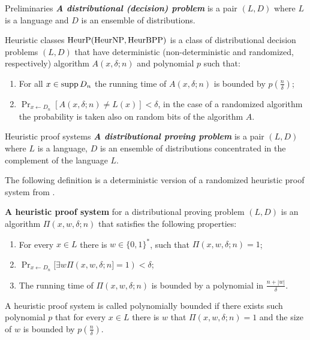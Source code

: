 \begin{frame}{}
\begin{columns}[t]
\begin{column}{0.32\linewidth}
\begin{block}{Preliminaries}
                {\bf \em A distributional (decision) problem} is a pair $(L, D)$
                where $L$ is a language and $D$ is an ensemble of distributions.
		\end{block}

        \begin{block}{Heuristic classes}
	        $\rm HeurP (HeurNP, HeurBPP)$ is a class of distributional decision
            problems $(L,D)$ that have deterministic (non-deterministic and
            randomized, respectively) algorithm $A(x, \delta; n)$ and polynomial
            $p$ such that:
			\begin{enumerate}
				\item For all $x \in \operatorname*{supp} D_n$ the running time of $A(x, \delta; n)$
		            is bounded by  $p(\frac{n}{\delta})$; 
				\item $\Pr_{x \gets D_n} [A(x, \delta; n) \neq L(x)] < \delta$, in
		            the case of a randomized algorithm the probability is taken also
                    on random bits of the algorithm $A$.
			\end{enumerate}            
        \end{block}

        \begin{block}{Heuristic proof systems}
            {\bf \em A distributional proving problem} is a pair $(L,D)$ where $L$ is a
			language, $D$ is an ensemble of distributions concentrated in the
            complement of the language $L$.

			The following definition is a deterministic version of a randomized
            heuristic proof system from \cite{HIMS12}.

            {\bf A heuristic proof system} for a distributional proving problem
            $(L, D)$ is an algorithm $\Pi(x, w, \delta; n)$ that satisfies the
            following properties: 
			\begin{enumerate}
				\item For every $x \in L$ there is $w \in \{0, 1\}^*$, such that
		            $\Pi(x, w, \delta; n)=1$;
				\item $\Pr_{x\gets D_n}[\exists w \Pi(x, w, \delta; n] = 1) <
		            \delta$;
				\item The running time of $\Pi(x, w, \delta; n)$ is bounded by a
		            polynomial in $\frac{n + |w|}{\delta}$. 
			\end{enumerate}
			A heuristic proof system is called polynomially bounded if there exists
            such polynomial $p$ that for every $x\in L$ there is $w$ that 
			$\Pi(x, w, \delta; n) = 1$ and the size of $w$ is bounded by
            $p(\frac{n}{\delta})$.
        \end{block}
        

\end{column}
\end{columns}
\end{frame}
